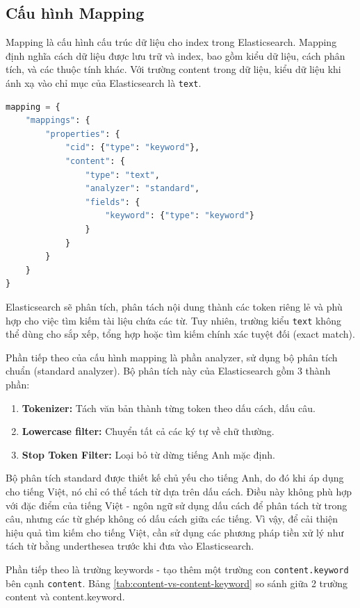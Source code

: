 \documentclass[../BTL.tex]{subfiles}
\begin{document}
\subsection*{Cấu hình Mapping}
Mapping là cấu hình cấu trúc dữ liệu cho index trong Elasticsearch. Mapping định nghĩa cách dữ liệu được lưu trữ và index, bao gồm kiểu dữ liệu, cách phân tích, và các thuộc tính khác. Với trường content trong dữ liệu, kiểu dữ liệu khi ánh xạ vào chỉ mục của Elasticsearch là \texttt{text}.

\begin{lstlisting}[language=Python]
mapping = {
    "mappings": {
        "properties": {
            "cid": {"type": "keyword"},
            "content": {
                "type": "text",
                "analyzer": "standard",
                "fields": {
                    "keyword": {"type": "keyword"}
                }
            }
        }
    }
}
\end{lstlisting}

Elasticsearch sẽ phân tích, phân tách nội dung thành các token riêng lẻ và phù hợp cho việc tìm kiếm tài liệu chứa các từ. Tuy nhiên, trường kiểu \texttt{text} không thể dùng cho sắp xếp, tổng hợp hoặc tìm kiếm chính xác tuyệt đối (exact match).

Phần tiếp theo của cấu hình mapping là phần analyzer, sử dụng bộ phân tích chuẩn (standard analyzer). Bộ phân tích này của Elasticsearch gồm 3 thành phần:

\begin{enumerate}
    \item \textbf{Tokenizer:} Tách văn bản thành từng token theo dấu cách, dấu câu.
    \item \textbf{Lowercase filter:} Chuyển tất cả các ký tự về chữ thường.
    \item \textbf{Stop Token Filter:} Loại bỏ từ dừng tiếng Anh mặc định.
\end{enumerate}

Bộ phân tích standard được thiết kế chủ yếu cho tiếng Anh, do đó khi áp dụng cho tiếng Việt, nó chỉ có thể tách từ dựa trên dấu cách. Điều này không phù hợp với đặc điểm của tiếng Việt - ngôn ngữ sử dụng dấu cách để phân tách từ trong câu, nhưng các từ ghép không có dấu cách giữa các tiếng. Vì vậy, để cải thiện hiệu quả tìm kiếm cho tiếng Việt, cần sử dụng các phương pháp tiền xử lý như tách từ bằng underthesea trước khi đưa vào Elasticsearch.

Phần tiếp theo là trường keywords - tạo thêm một trường con \texttt{content.keyword} bên cạnh \texttt{content}. Bảng \ref{tab:content-vs-content-keyword} so sánh giữa 2 trường content và content.keyword.
\end{document}
